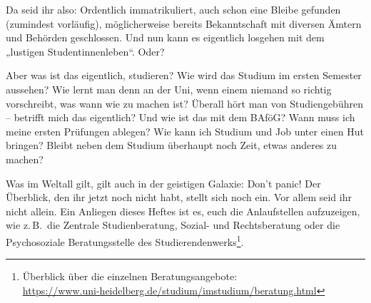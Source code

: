 \label{dschungel}
Da seid ihr also: Ordentlich immatrikuliert, auch schon eine Bleibe gefunden (zumindest vorläufig), möglicherweise bereits Bekanntschaft mit diversen Ämtern und Behörden geschlossen. Und nun kann es eigentlich losgehen mit dem „lustigen Studentinnenleben“. Oder?

Aber was ist das eigentlich, studieren? Wie wird das Studium im ersten Semester aussehen? Wie lernt man denn an der Uni, wenn einem niemand so richtig vorschreibt, was wann wie zu machen ist? Überall hört man von Studiengebühren -- betrifft mich das eigentlich? Und wie ist das mit dem BAföG? Wann muss ich meine ersten Prüfungen ablegen? Wie kann ich Studium und Job unter einen Hut bringen? Bleibt neben dem Studium überhaupt noch Zeit, etwas anderes zu machen?

Was im Weltall gilt, gilt auch in der geistigen Galaxie: Don't panic! Der Überblick, den ihr jetzt noch nicht habt, stellt sich noch ein. Vor allem seid ihr nicht allein. Ein Anliegen dieses Heftes ist es, euch die Anlaufstellen aufzuzeigen, wie z.\,B.\ die Zentrale Studienberatung, Sozial- und Rechtsberatung oder die Psychosoziale Beratungsstelle des Studierendenwerks\footnote{Überblick über die einzelnen Beratungsangebote:\\\url{https://www.uni-heidelberg.de/studium/imstudium/beratung.html}}.


